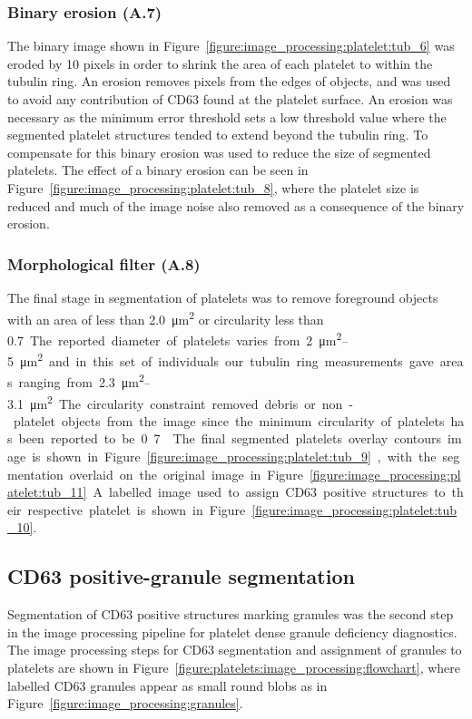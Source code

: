 \subsubsection{Binary erosion (A.7)}
The binary image shown in Figure~\ref{figure:image_processing:platelet:tub_6} was eroded by 10 pixels in order to shrink the area of each platelet to within the tubulin ring. An erosion removes pixels from the edges of objects, and was used to avoid any contribution of CD63 found at the platelet surface. An erosion was necessary as the minimum error threshold sets a low threshold value where the segmented platelet structures tended to extend beyond the tubulin ring. To compensate for this binary erosion was used to reduce the size of segmented platelets. The effect of a binary erosion can be seen in Figure~\ref{figure:image_processing:platelet:tub_8}, where the platelet size is reduced and much of the image noise also removed as a consequence of the binary erosion.

\subsubsection{Morphological filter (A.8)}
The final stage in segmentation of platelets was to remove foreground objects with an area of less than \SI{2.0}{\micro\meter\squared} or circularity less than \SI{0.7}. The reported diameter of platelets varies from \SIrange{2}{5}{\micro\meter\squared} and in this set of individuals our tubulin ring measurements gave areas ranging from \SIrange{2.3}{3.1}{\micro\meter\squared}. The circularity constraint removed debris or non-platelet objects from the image since the minimum circularity of platelets has been reported to be 0.7~\cite{Kraus2013}. The final segmented platelets overlay contours image is shown in Figure~\ref{figure:image_processing:platelet:tub_9}, with the segmentation overlaid on the original image in Figure~\ref{figure:image_processing:platelet:tub_11}. A labelled image used to assign CD63 positive structures to their respective platelet is shown in Figure~\ref{figure:image_processing:platelet:tub_10}.

\subsection{CD63 positive-granule segmentation}
\label{platelets:image_processing:granules}
Segmentation of CD63 positive structures marking granules was the second step in the image processing pipeline for platelet dense granule deficiency diagnostics. The image processing steps for CD63 segmentation and assignment of granules to platelets are shown in Figure~\ref{figure:platelets:image_processing:flowchart}, where labelled CD63 granules appear as small round blobs as in Figure~\ref{figure:image_processing:granules}.

